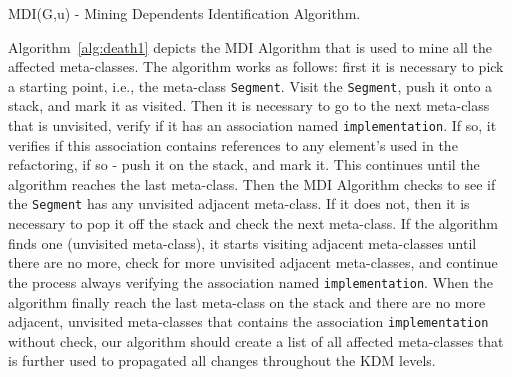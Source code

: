 \begin{algorithm}[h]
     \SetAlgoLined
     \caption{MDI(G,u) - Mining Dependents Identification Algorithm.}
     \label{alg:death1}
   \end{algorithm}

Algorithm~\ref{alg:death1} depicts the MDI Algorithm that is used to mine all the affected meta-classes. %
%
The algorithm works as follows: first it is necessary to pick a starting point, i.e., the meta-class \texttt{Segment}. Visit the \texttt{Segment}, push it onto a stack, and mark it as visited. Then it is necessary to go to the next meta-class that is unvisited, verify if it has an association named \texttt{implementation}. If so, it verifies if this association contains references to any element's used in the refactoring, if so - push it on the stack, and mark it. This continues until the algorithm reaches the last meta-class. Then the MDI Algorithm checks to see if the \texttt{Segment} has any unvisited adjacent meta-class. If it does not, then it is necessary to pop it off the stack and check the next meta-class. If the algorithm finds one (unvisited meta-class), it starts visiting adjacent meta-classes until there are no more, check for more unvisited adjacent meta-classes, and continue the process always verifying the association named \texttt{implementation}. When the algorithm finally reach the last meta-class on the stack and there are no more adjacent, unvisited meta-classes that contains the association \texttt{implementation} without check, our algorithm should create a list of all affected meta-classes that is further used to propagated all changes throughout the KDM levels. 
%
%
%
%
%
%
%
%
%

